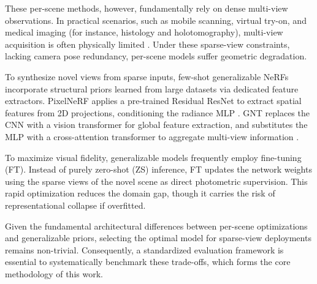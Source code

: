 These per-scene methods, however, fundamentally rely on dense multi-view observations. In practical scenarios, such as mobile scanning, virtual try-on, and medical imaging (for instance, histology and holotomography), multi-view acquisition is often physically limited \cite{ijms24076747}. Under these sparse-view constraints, lacking camera pose redundancy, per-scene models suffer geometric degradation.

To synthesize novel views from sparse inputs, few-shot generalizable NeRFs incorporate structural priors learned from large datasets via dedicated feature extractors. PixelNeRF  applies a pre-trained Residual ResNet to extract spatial features from 2D projections, conditioning the radiance MLP \cite{yu2021pixelnerfneuralradiancefields}. GNT replaces the CNN with a vision transformer for global feature extraction, and substitutes the MLP with a cross-attention transformer to aggregate multi-view information \cite{t2023attentionnerfneeds}.

To maximize visual fidelity, generalizable models frequently employ fine-tuning (FT). Instead of purely zero-shot (ZS) inference, FT updates the network weights using the sparse views of the novel scene as direct photometric supervision. This rapid optimization reduces the domain gap, though it carries the risk of representational collapse if overfitted.


Given the fundamental architectural differences between per-scene optimizations and generalizable priors, selecting the optimal model for sparse-view deployments remains non-trivial. Consequently, a standardized evaluation framework is essential to systematically benchmark these trade-offs, which forms the core methodology of this work.
